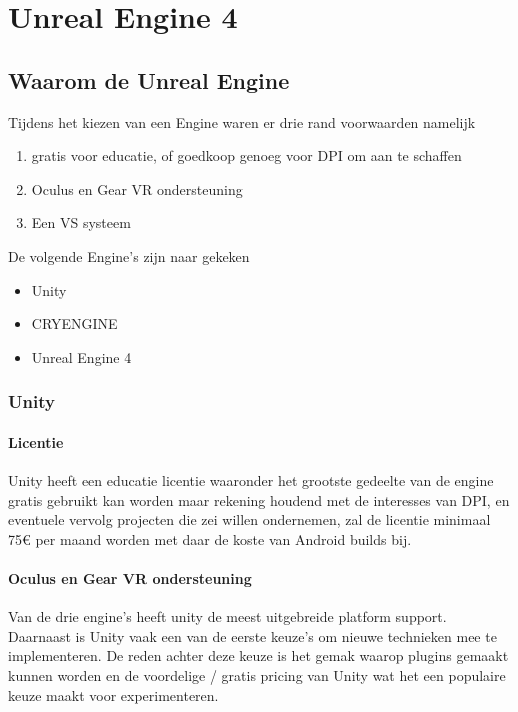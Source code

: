 \chapter{Unreal Engine 4}

\section{Waarom de Unreal Engine}

Tijdens het kiezen van een Engine waren er drie rand voorwaarden namelijk 
\begin{enumerate}
	\item gratis voor educatie, of goedkoop genoeg voor DPI om aan te schaffen
	\item Oculus en Gear VR ondersteuning
	\item Een VS systeem
\end{enumerate}

De volgende Engine’s zijn naar gekeken 
\begin{itemize}
\item Unity
\item CRYENGINE
\item Unreal Engine 4
\end{itemize}

\subsection{Unity}

\subsubsection{Licentie}
Unity heeft een educatie licentie waaronder het grootste gedeelte van de engine gratis gebruikt kan worden maar rekening houdend met de interesses van DPI, en eventuele vervolg projecten die zei willen ondernemen, zal de licentie minimaal 75€ per maand worden met daar de koste van Android builds bij.

\subsubsection{Oculus en Gear VR ondersteuning}
Van de drie engine’s heeft unity de meest uitgebreide platform support. Daarnaast is Unity vaak een van de eerste keuze’s om nieuwe technieken mee te implementeren. De reden achter deze keuze is het gemak waarop plugins gemaakt kunnen worden en de voordelige / gratis pricing van Unity wat het een populaire keuze maakt voor experimenteren.

